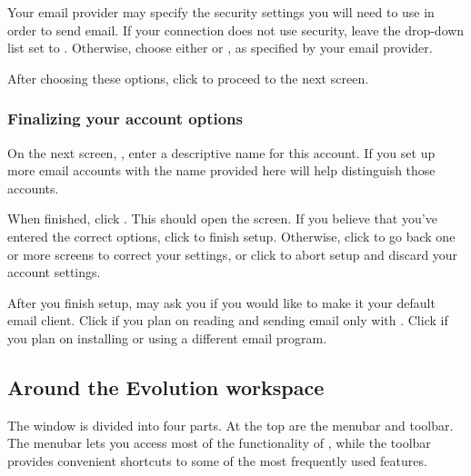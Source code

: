 Your email provider may specify the security settings you will need to use
in order to send email. If your connection does not use security, leave
the  drop-down list set to .
Otherwise, choose either  or , as specified by your email provider.

After choosing these options, click  to proceed to the 
next screen.

\subsubsection{Finalizing your account options}

On the next screen, , enter a descriptive
name for this account. If you set up more email accounts with  the name provided here will help distinguish those accounts.

When finished, click . This should open the
 screen. If you believe that you've entered the correct options,
click  to finish setup. Otherwise, click 
 to go back one or more screens to correct your settings,
or click  to abort setup and discard your account 
settings. 

After you finish setup,  may ask you if you would like to
make it your default email client. Click  if you 
plan on reading and sending email only with . Click  
if you plan on installing or using a different email program.

\subsection{Around the Evolution workspace}



The  window is divided into four parts. At the top are the 
menubar and toolbar. The menubar lets you access most of the functionality
of , while the toolbar provides convenient shortcuts to some of
the most frequently used features.

